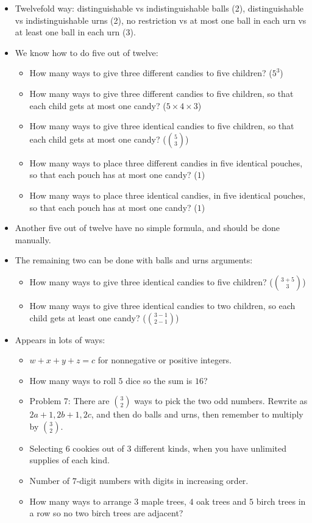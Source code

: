 \documentclass[10pt,paper=letter]{scrartcl}
\begin{document}
\begin{itemize}
  \item Twelvefold way: distinguishable vs indistinguishable balls (2), distinguishable vs indistinguishable urns (2), no restriction vs at most one ball in each urn vs at least one ball in each urn (3).
  \item We know how to do five out of twelve:
  \begin{itemize}
    \item How many ways to give three different candies to five children? ($5^3$)
    \item How many ways to give three different candies to five children, so that each child gets at most one candy? ($5\times 4 \times 3$)
    \item How many ways to give three identical candies to five children, so that each child gets at most one candy? ($\binom{5}{3}$)
    \item How many ways to place three different candies in five identical pouches, so that each pouch has at most one candy? ($1$)
    \item How many ways to place three identical candies, in five identical pouches, so that each pouch has at most one candy? ($1$)
  \end{itemize}
  \item Another five out of twelve have no simple formula, and should be done manually.
  \item The remaining two can be done with balls and urns arguments:
  \begin{itemize}
    \item How many ways to give three identical candies to five children? ($\binom{3+5}{3}$)
    \item How many ways to give three identical candies to two children, so each child gets at least one candy? ($\binom{3-1}{2-1}$)
  \end{itemize}
  \item Appears in lots of ways:
  \begin{itemize}
    \item $w+x+y+z = c$ for nonnegative or positive integers.
    \item How many ways to roll $5$ dice so the sum is $16$?
    \item Problem 7: There are $\binom{3}{2}$ ways to pick the two odd numbers. Rewrite as $2a+1, 2b+1, 2c$, and then do balls and urns, then remember to multiply by $\binom{3}{2}$.
    \item Selecting $6$ cookies out of $3$ different kinds, when you have unlimited supplies of each kind.
    \item Number of $7$-digit numbers with digits in increasing order.
    \item How many ways to arrange $3$ maple trees, $4$ oak trees and $5$ birch trees in a row so no two birch trees are adjacent?
  \end{itemize}
\end{itemize}
\end{document}
